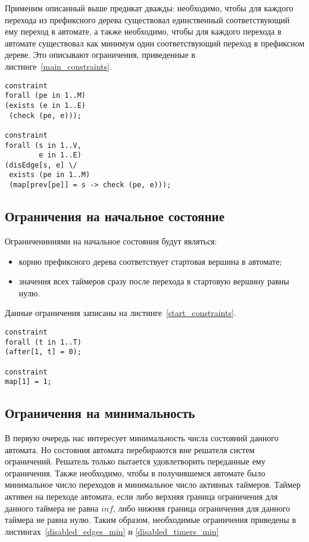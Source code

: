 \documentclass[times,specification,annotation]{itmo-student-thesis}
\begin{document}
Применим описанный выше предикат дважды: необходимо, чтобы для каждого перехода из префиксного дерева существовал единственный
соответствующий ему переход в автомате, а также необходимо, чтобы для каждого перехода в автомате существовал как минимум один соответствующий
переход в префиксном дереве. Это описывают ограничения, приведенные в листинге~\ref{main_constraints}.

\begin{lstlisting}[float=!h,language=Mzn,caption={Использование основного предиката},label={main_constraints}]
constraint
forall (pe in 1..M)
(exists (e in 1..E)
 (check (pe, e)));

constraint
forall (s in 1..V,
        e in 1..E)
(disEdge[s, e] \/
 exists (pe in 1..M)
 (map[prev[pe]] = s -> check (pe, e)));
\end{lstlisting}

\subsection{Ограничения на начальное состояние}

Ограничениниями на начальное состояния будут являться:

\begin{itemize}
  \item корню префиксного дерева соответствует стартовая вершина в автомате;
  \item значения всех таймеров сразу после перехода в стартовую вершину равны нулю.
\end{itemize}

Данные ограничения записаны на листинге~\ref{start_constraints}.

\begin{lstlisting}[float=!h,language=Mzn,caption={Стартовые ограничения},label={start_constraint}]
constraint
forall (t in 1..T)
(after[1, t] = 0);

constraint
map[1] = 1;
\end{lstlisting}

\subsection{Ограничения на минимальность}

В первую очередь нас интересует минимальность числа состояний данного автомата. Но состояния автомата перебираются вне решателя систем ограничений. Решатель только пытается удовлетворить
переданные ему ограничения. Также необходимо, чтобы в получившемся автомате было минимальное число переходов и минимальное число
активных таймеров. Таймер активен на переходе автомата, если либо верхняя граница ограничения для данного таймера не равна $inf$, либо нижняя граница ограничения
для данного таймера не равна нулю. Таким образом, необходимые ограничения приведены в листингах~\ref{disabled_edges_min} и \ref{disabled_timers_min}
\end{document}
